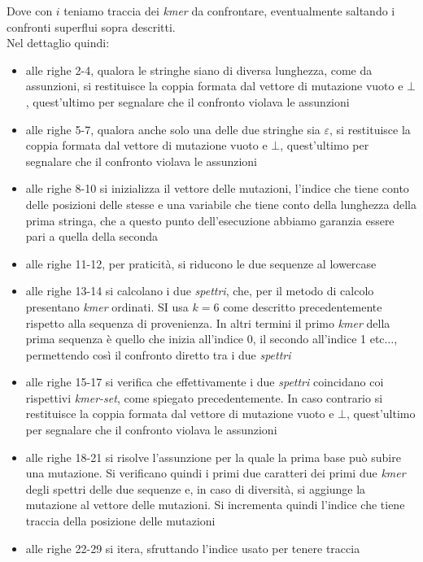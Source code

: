 \documentclass[a4paper,12pt, oneside]{book}
\begin{document}
\newpage
\noindent
Dove con $i$ teniamo traccia dei \textit{kmer} da confrontare, eventualmente
saltando i confronti superflui sopra descritti.\\
Nel dettaglio quindi:
\begin{itemize}
  \item alle righe 2-4, qualora le stringhe siano di diversa lunghezza, come da
  assunzioni, si restituisce la coppia formata dal vettore di mutazione vuoto e
  $\bot$, quest'ultimo per segnalare che il confronto violava le assunzioni
  \item alle righe 5-7, qualora anche solo una delle due stringhe sia
  $\varepsilon$, si restituisce la coppia formata dal vettore di mutazione vuoto
  e $\bot$, quest'ultimo per segnalare che il confronto violava le assunzioni
  \item alle righe 8-10 si inizializza il vettore delle mutazioni, l'indice che
  tiene conto delle posizioni delle stesse e una variabile che tiene conto della
  lunghezza della prima stringa, che a questo punto dell'esecuzione abbiamo
  garanzia essere pari a quella della seconda
  \item alle righe 11-12, per praticità, si riducono le due sequenze al
  lowercase
  \item alle righe 13-14 si calcolano i due \textit{spettri}, che, per il metodo
  di calcolo presentano \textit{kmer} ordinati. SI usa $k=6$ come descritto
  precedentemente 
  rispetto alla sequenza di provenienza. In altri termini il primo \textit{kmer}
  della prima sequenza è quello che inizia all'indice 0, il secondo all'indice 1
  etc$\ldots$, permettendo così il confronto diretto tra i due \textit{spettri}
  \item alle righe 15-17 si verifica che effettivamente i due \textit{spettri}
  coincidano coi rispettivi \textit{kmer-set}, come spiegato precedentemente. In
  caso contrario si restituisce 
  la coppia formata dal vettore di mutazione vuoto e $\bot$, quest'ultimo per
  segnalare che il confronto violava le assunzioni 
  \item alle righe 18-21 si risolve l'assunzione per la quale la prima base può
  subire una mutazione. Si verificano quindi i primi due caratteri dei primi due
  \textit{kmer} degli spettri delle due sequenze e, in caso di diversità, si
  aggiunge la mutazione al vettore delle 
  mutazioni. Si incrementa quindi l'indice che tiene traccia della posizione
  delle mutazioni
  \item alle righe 22-29 si itera, sfruttando l'indice usato per tenere traccia

\end{itemize}
\end{document}
